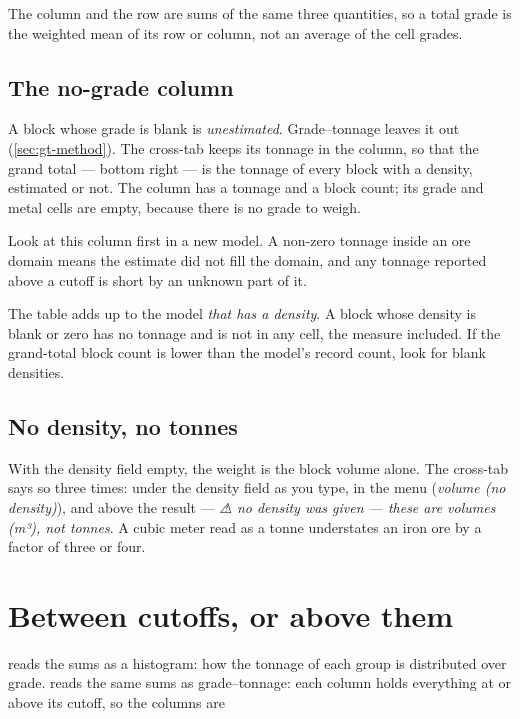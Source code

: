 The  column and the  row are sums of the same three quantities, so a total grade is the weighted mean of its row or column, not an average of the cell grades.

\subsection{The no-grade column}\label{sec:xtab-nograde}
A block whose grade is blank is \emph{unestimated}. Grade–tonnage leaves it out (\cref{sec:gt-method}). The cross-tab keeps its tonnage in the  column, so that the grand total — bottom right — is the tonnage of every block with a density, estimated or not. The column has a tonnage and a block count; its grade and metal cells are empty, because there is no grade to weigh.

Look at this column first in a new model. A non-zero  tonnage inside an ore domain means the estimate did not fill the domain, and any tonnage reported above a cutoff is short by an unknown part of it.

\begin{caution}
The table adds up to the model \emph{that has a density}. A block whose density is blank or zero has no tonnage and is not in any cell, the  measure included. If the grand-total block count is lower than the model's record count, look for blank densities.
\end{caution}

\subsection{No density, no tonnes}
With the density field empty, the weight is the block volume alone. The cross-tab says so three times: under the density field as you type, in the  menu (\emph{volume (no density)}), and above the result — \emph{⚠ no density was given — these are volumes (m³), not tonnes}. A cubic meter read as a tonne understates an iron ore by a factor of three or four.

\section{Between cutoffs, or above them}\label{sec:xtab-cum}
 reads the sums as a histogram: how the tonnage of each group is distributed over grade.  reads the same sums as grade–tonnage: each column holds everything at or above its cutoff, so the columns are

